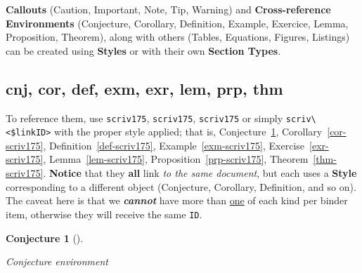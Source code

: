 \documentclass[
  12pt,
  a4paper,
  numbers=noenddot,
  titlepage,
  toclink=all,
  toc=bibliography]{scrbook}
\theoremstyle{plain}
\theoremstyle{plain}
\theoremstyle{definition}
\theoremstyle{plain}
\theoremstyle{definition}
\theoremstyle{definition}
\theoremstyle{plain}
\theoremstyle{plain}
\newtheorem{conjecture}{Conjecture}[section]
\theoremstyle{remark}
\begin{document}
\begin{tcolorbox}[enhanced jigsaw, breakable, bottomrule=.15mm, rightrule=.15mm, title=\textcolor{quarto-callout-tip-color}{\faLightbulb}\hspace{0.5em}{Tip}, colbacktitle=quarto-callout-tip-color!10!white, colframe=quarto-callout-tip-color-frame, colback=white, opacitybacktitle=0.6, arc=.35mm, left=2mm, toptitle=1mm, toprule=.15mm, titlerule=0mm, coltitle=black, bottomtitle=1mm, leftrule=.75mm, opacityback=0]

\textbf{Callouts} (Caution, Important, Note, Tip, Warning) and
\textbf{Cross-reference Environments} (Conjecture, Corollary,
Definition, Example, Exercice, Lemma, Proposition, Theorem), along with
others (Tables, Equations, Figures, Listings) can be created using
\textbf{Styles} or with their own \textbf{Section Types}.

\end{tcolorbox}

\hypertarget{sec-scriv175}{%
\subsection{cnj, cor, def, exm, exr, lem, prp, thm}\label{sec-scriv175}}

\protect\hypertarget{scriv175}{}{}

To reference them, use \texttt{scriv175}, \texttt{scriv175},
\texttt{scriv175} or simply
\texttt{scriv\textbackslash{}\textless{}\$linkID\textgreater{}} with the
proper style applied; that is,
\protect\hypertarget{cite_37}{}{\label{cite_37}Conjecture~\ref{cnj-scriv175}},
\protect\hypertarget{cite_38}{}{\label{cite_38}Corollary~\ref{cor-scriv175}},
\protect\hypertarget{cite_39}{}{\label{cite_39}Definition~\ref{def-scriv175}},
\protect\hypertarget{cite_40}{}{\label{cite_40}Example~\ref{exm-scriv175}},
\protect\hypertarget{cite_41}{}{\label{cite_41}Exercise~\ref{exr-scriv175}},
\protect\hypertarget{cite_42}{}{\label{cite_42}Lemma~\ref{lem-scriv175}},
\protect\hypertarget{cite_43}{}{\label{cite_43}Proposition~\ref{prp-scriv175}},
\protect\hypertarget{cite_44}{}{\label{cite_44}Theorem~\ref{thm-scriv175}}.
\textbf{Notice} that they \textbf{all} link \emph{to the same document},
but each uses a \textbf{Style} corresponding to a different object
(Conjecture, Corollary, Definition, and so on). The caveat here is that
we \textbf{\emph{cannot}} have more than \ul{one} of each kind per
binder item, otherwise they will receive the same \texttt{ID}.

\begin{conjecture}[]\protect\hypertarget{cnj-scriv175}{}\label{cnj-scriv175}

Conjecture environment

\end{conjecture}
\end{document}
